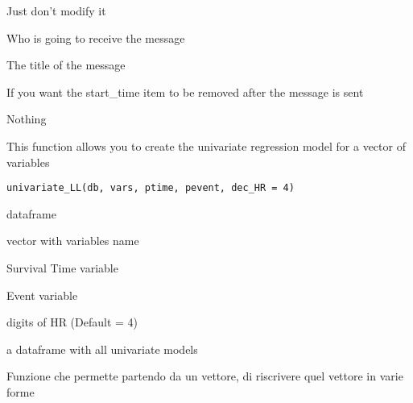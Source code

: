 \documentclass[a4paper]{book}
\begin{document}
%
\begin{Arguments}
\begin{ldescription}
\item[\code{process\_time}] Just don't modify it

\item[\code{dest}] Who is going to receive the message

\item[\code{script}] The title of the message

\item[\code{rm\_start\_time}] If you want the start\_time item to be removed after the message is sent
\end{ldescription}
\end{Arguments}
%
\begin{Value}
Nothing
\end{Value}
%
\begin{Description}
This function allows you to create the univariate regression model for a vector of variables
\end{Description}
%
\begin{Usage}
\begin{verbatim}
univariate_LL(db, vars, ptime, pevent, dec_HR = 4)
\end{verbatim}
\end{Usage}
%
\begin{Arguments}
\begin{ldescription}
\item[\code{db}] dataframe

\item[\code{vars}] vector with variables name

\item[\code{ptime}] Survival Time variable

\item[\code{pevent}] Event variable

\item[\code{dec\_HR}] digits of HR (Default = 4)
\end{ldescription}
\end{Arguments}
%
\begin{Value}
a dataframe with all univariate models
\end{Value}
%
\begin{Description}
Funzione che permette partendo da un vettore, di riscrivere quel vettore in varie forme
\end{Description}
\end{document}
